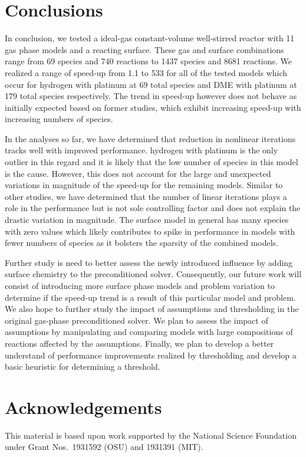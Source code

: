 \documentclass[12pt]{ussci}
\begin{document}
\section{Conclusions}

In conclusion, we tested a ideal-gas constant-volume well-stirred reactor with 11 gas phase models and a reacting surface. 
These gas and surface combinations range from 69 species and 740 reactions to 1437 species and 8681 reactions.
We realized a range of speed-up from 1.1 to 533 for all of the tested models which occur for hydrogen with platinum at 69 total species and DME with platinum at 179 total species respectively. 
The trend in speed-up however does not behave as initially expected based on former studies, which exhibit increasing speed-up with increasing numbers of species.

In the analyses so far, we have determined that reduction in nonlinear iterations tracks well with improved performance.
hydrogen with platinum is the only outlier in this regard and it is likely that the low number of species in this model is the cause.
However, this does not account for the large and unexpected variations in magnitude of the speed-up for the remaining models.
Similar to other studies, we have determined that the number of linear iterations plays a role in the performance but is not sole controlling factor and does not explain the drastic variation in magnitude.
The surface model in general has many species with zero values which likely contributes to spike in performance in models with fewer numbers of species as it bolsters the sparsity of the combined models.

Further study is need to better assess the newly introduced influence by adding surface chemistry to the preconditioned solver.
Consequently, our future work will consist of introducing more surface phase models and problem variation to determine if the speed-up trend is a result of this particular model and problem.
We also hope to further study the impact of assumptions and thresholding in the original gas-phase preconditioned solver.
We plan to assess the impact of assumptions by manipulating and comparing models with large compositions of reactions affected by the assumptions.
Finally, we plan to develop a better understand of performance improvements realized by thresholding and develop a basic heuristic for determining a threshold.

\section{Acknowledgements}
This material is based upon work supported by the National Science Foundation under Grant Nos.~1931592 (OSU) and 1931391 (MIT).

\printbibliography
\end{document}
